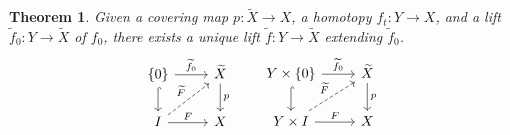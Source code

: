 \documentclass[11pt]{article}
\theoremstyle{definition}
\theoremstyle{plain}
\newtheorem{theorem}{Theorem}[section]
\theoremstyle{remark}
\begin{document}
\newpage
\begin{theorem}
Given a covering map $p:\widetilde{X}\to X$, a homotopy $f_t:Y\to X$, and a lift $\widetilde{f}_0:Y\to\widetilde{X}$ of $f_0$, there exists a unique lift $\widetilde{f}:Y\to\widetilde{X}$ extending $\widetilde{f}_0$.
\[\begin{tikzcd}
\{0\}\arrow{r}{\widetilde{f}_0}\arrow[hookrightarrow]{d}&\widetilde{X}\arrow{d}{p}\\
I\arrow{r}{F}\arrow[dashed]{ur}{\widetilde{F}}&X
\end{tikzcd}\quad\quad
\begin{tikzcd}
Y\times\{0\}\arrow{r}{\widetilde{f}_0}\arrow[hookrightarrow]{d}&\widetilde{X}\arrow{d}{p}\\
Y\times I\arrow{r}{F}\arrow[dashed]{ur}{\widetilde{F}}&X
\end{tikzcd}\]
\end{theorem}
\end{document}
